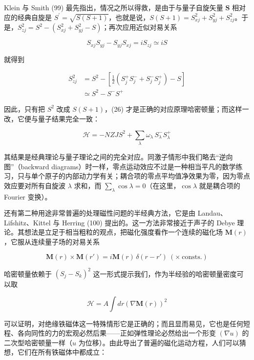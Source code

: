 Klein 与 Smith (99) 最先指出，情况之所以得救，是由于与量子自旋矢量 $\mathbf{S}$ 相对应的经典自旋是 $S^{'} = \sqrt{S(S+1)}$，也就是说，$S(S+1) = S_{xj}^{2} + S_{yj}^{2} + S_{zj}^{2}$。于是，$S_{zj}^{2} = S^{2} - (S_{xj}^{2} + S_{yj}^{2} - S)$；再次应用近似对易关系

\begin{equation*}
S_{xj}S_{yj} - S_{yj}S_{xj} = iS_{zj} \simeq iS
\end{equation*}

就得到

\begin{align*}
S_{zj}^{2} &= S^{2} - \left[\frac{1}{2}\left(S^{+}_{j}S^{-}_{j} + S^{-}_{j}S^{+}_{j}\right) - S\right] \\
&\simeq S^{2} - S^{-}S^{+}
\end{align*}

因此，只有把 $S^{2}$ 改成 $S(S+1)$，(26) 才是正确的对应原理哈密顿量；而这样一改，它便与量子结果完全一致：

\begin{equation*}
\mathcal{H} = -NZJS^{2} + \sum_{\lambda} \omega_{\lambda}\, S^{-}_{\lambda}S^{+}_{\lambda}
\end{equation*}

其结果是经典理论与量子理论之间的完全对应。同激子情形中我们略去“逆向图”（backward diagrams）时一样，零点运动效应不过是一种相当平凡的数学练习，只与单个原子的内部动力学有关；耦合项的零点平均值净效果为零，因为零点效应要对所有自旋波 $\lambda$ 求和，而 $\sum_{\lambda}\cos\lambda = 0$（在这里，$\cos\lambda$ 就是耦合项的 Fourier 变换）。

还有第二种用途非常普遍的处理磁性问题的半经典方法，它是由 Landau、Lifshitz、Kittel 与 Herring (100) 提出的。这一方法非常接近于声子的 Debye 理论。其想法是立足于相当粗粒的观点，把磁化强度看作一个连续的磁化场 $\mathbf{M}(r)$，它服从连续量子场的对易关系

\begin{equation*}
\mathbf{M}(r)\times\mathbf{M}(r') = i\mathbf{M}(r)\,\delta(r-r')\ \left(\times\ \text{consts.}\right)
\end{equation*}

哈密顿量依赖于 $(S_{j} - S_{k})^{2}$ 这一形式提示我们，作为半经验的哈密顿量密度可以取

\begin{equation*}
\mathcal{H} = A\int dr\left(\nabla\mathbf{M}(r)\right)^{2} \tag{27}
\end{equation*}

可以证明，对绝缘铁磁体这一特殊情形它是正确的；而且显而易见，它也是任何短程、各向同性的力的宏观必然后果——正如弹性理论必然给出一个形变 $(\nabla u)$ 的二次型哈密顿量一样（$u$ 为位移）。由此导出了普遍的磁化运动方程，人们可以猜想，它们在所有铁磁体中都成立：

